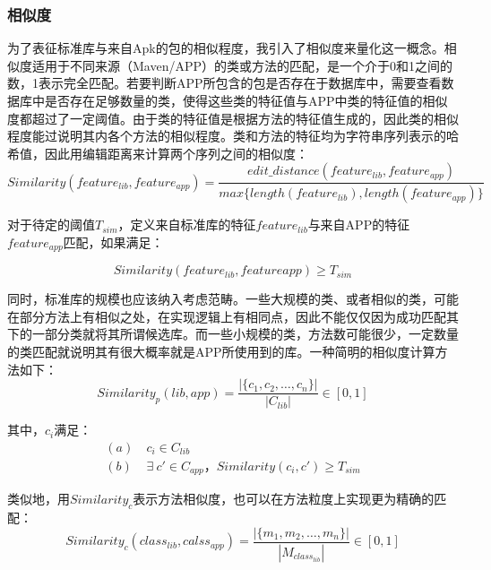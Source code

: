 \subsubsection{相似度}

为了表征标准库与来自Apk的包的相似程度，我引入了相似度来量化这一概念。相似度适用于不同来源（Maven/APP）的类或方法的匹配，是一个介于0和1之间的数，1表示完全匹配。若要判断APP所包含的包是否存在于数据库中，需要查看数据库中是否存在足够数量的类，使得这些类的特征值与APP中类的特征值的相似度都超过了一定阈值。由于类的特征值是根据方法的特征值生成的，因此类的相似程度能过说明其内各个方法的相似程度。类和方法的特征均为字符串序列表示的哈希值，因此用编辑距离来计算两个序列之间的相似度：
\begin{equation}
Similarity(feature_{lib},feature_{app})=\frac{edit\_distance(feature_{lib},feature_{app})}{max\{length(feature_{lib}),length(feature_{app})\}}
\end{equation}

对于待定的阈值$T_{sim}$，定义来自标准库的特征$feature_{lib}$与来自APP的特征$feature_{app}$匹配，如果满足：

\begin{equation}
Similarity(feature_{lib},feature{app})\ge T_{sim}
\end{equation}


同时，标准库的规模也应该纳入考虑范畴。一些大规模的类、或者相似的类，可能在部分方法上有相似之处，在实现逻辑上有相同点，因此不能仅仅因为成功匹配其下的一部分类就将其所谓候选库。而一些小规模的类，方法数可能很少，一定数量的类匹配就说明其有很大概率就是APP所使用到的库。一种简明的相似度计算方法如下：
\begin{equation}
Similarity_p(lib,app)=\frac{|\{c_1,c_2,\dots ,c_n\}|}{|C_{lib}|} \in [0,1]
\end{equation}

其中，$c_i$满足：
\begin{subequations}
\begin{align}
(a)&\ c_i \in C_{lib}\\
(b)&\ \exists\  c'\in C_{app}，Similarity(c_i,c')\ge T_{sim}
\end{align}
\end{subequations}


类似地，用$Similarity_c$表示方法相似度，也可以在方法粒度上实现更为精确的匹配：
\begin{equation}
Similarity_c(class_{lib},calss_{app})=\frac{|\{m_1,m_2,\dots ,m_n\}|}{|M_{class_{lib}}|} \in [0,1]
\end{equation}

